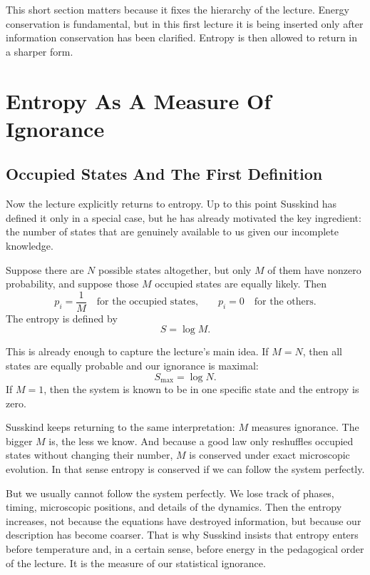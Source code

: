 This short section matters because it fixes the hierarchy of the lecture. Energy conservation is fundamental, but in this first lecture it is being inserted only after information conservation has been clarified. Entropy is then allowed to return in a sharper form.

\section{Entropy As A Measure Of Ignorance}

\subsection{Occupied States And The First Definition}

Now the lecture explicitly returns to entropy. Up to this point Susskind has defined it only in a special case, but he has already motivated the key ingredient: the number of states that are genuinely available to us given our incomplete knowledge.

Suppose there are \(N\) possible states altogether, but only \(M\) of them have nonzero probability, and suppose those \(M\) occupied states are equally likely. Then
\begin{equation}
p_i=\frac{1}{M}
\quad\text{for the occupied states,}
\qquad
p_i=0
\quad\text{for the others.}
\end{equation}
The entropy is defined by
\begin{equation}
S=\log M.
\end{equation}

This is already enough to capture the lecture's main idea. If \(M=N\), then all states are equally probable and our ignorance is maximal:
\begin{equation}
S_{\max}=\log N.
\end{equation}
If \(M=1\), then the system is known to be in one specific state and the entropy is zero.

Susskind keeps returning to the same interpretation: \(M\) measures ignorance. The bigger \(M\) is, the less we know. And because a good law only reshuffles occupied states without changing their number, \(M\) is conserved under exact microscopic evolution. In that sense entropy is conserved if we can follow the system perfectly.

But we usually cannot follow the system perfectly. We lose track of phases, timing, microscopic positions, and details of the dynamics. Then the entropy increases, not because the equations have destroyed information, but because our description has become coarser. That is why Susskind insists that entropy enters before temperature and, in a certain sense, before energy in the pedagogical order of the lecture. It is the measure of our statistical ignorance.

